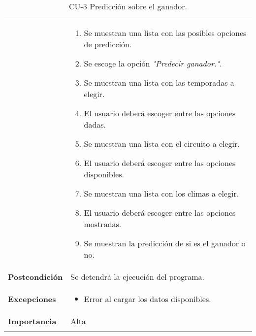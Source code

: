 \begin{longtable}[h!]{@{}ll@{}}
\begin{minipage}[t]{0.23\columnwidth}
\end{minipage} & \begin{minipage}[t]{0.71\columnwidth}\raggedright\strut
\begin{enumerate}
\def\labelenumi{\arabic{enumi}.}
\tightlist
\item
  Se muestran una lista con las posibles opciones de predicción.
\item
  Se escoge la opción \textit{"Predecir ganador."}.
\item
  Se muestran una lista con las temporadas a elegir.
\item
  El usuario deberá escoger entre las opciones dadas.
\item
  Se muestran una lista con el circuito a elegir.
\item
  El usuario deberá escoger entre las opciones disponibles.
\item
  Se muestran una lista con los climas a elegir.
\item
  El usuario deberá escoger entre las opciones mostradas.
\item
  Se muestran la predicción de si es el ganador o no.
\end{enumerate}\strut
\end{minipage}\tabularnewline
\begin{minipage}[t]{0.23\columnwidth}\raggedright\strut
\textbf{Postcondición}\strut
\end{minipage} & \begin{minipage}[t]{0.71\columnwidth}\raggedright\strut
Se detendrá la ejecución del programa.\strut
\end{minipage}\tabularnewline
\begin{minipage}[t]{0.23\columnwidth}\raggedright\strut
\textbf{Excepciones}\strut
\end{minipage} & \begin{minipage}[t]{0.71\columnwidth}\raggedright\strut
\begin{itemize}
\tightlist
\item
  Error al cargar los datos disponibles.
\end{itemize}\strut
\end{minipage}\tabularnewline
\begin{minipage}[t]{0.23\columnwidth}\raggedright\strut
\textbf{Importancia}\strut
\end{minipage} & \begin{minipage}[t]{0.71\columnwidth}\raggedright\strut
Alta\strut
\end{minipage}\tabularnewline
\bottomrule
\caption{CU-3 Predicción sobre el ganador.}
\end{longtable}

